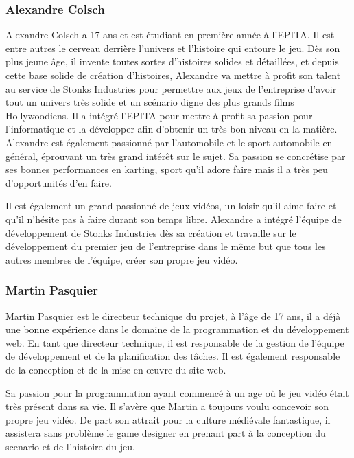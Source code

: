 \subsubsection*{Alexandre Colsch}

Alexandre Colsch a 17 ans et est étudiant en première année à l’EPITA.
Il est entre autres le cerveau derrière l’univers et l’histoire qui entoure le jeu.
Dès son plus jeune âge, il invente toutes sortes d’histoires solides et détaillées, et depuis cette base solide de création d’histoires, 
Alexandre va mettre à profit son talent au service de Stonks Industries pour permettre aux jeux de l’entreprise d’avoir tout un univers très solide et un scénario digne des plus grands films Hollywoodiens.
Il a intégré l’EPITA pour mettre à profit sa passion pour l’informatique et la développer afin d’obtenir un très bon niveau en la matière.
Alexandre est également passionné par l’automobile et le sport automobile en général, éprouvant un très grand intérêt sur le sujet.
Sa passion se concrétise par ses bonnes performances en karting, sport qu’il adore faire mais il a très peu d'opportunités d’en faire.

Il est également un grand passionné de jeux vidéos, un loisir qu’il aime faire et qu’il n'hésite pas à faire durant son temps libre.
Alexandre a intégré l'équipe de développement de Stonks Industries dès sa création et travaille sur le développement du premier jeu de l’entreprise dans le même but que tous les autres membres de l'équipe, créer son propre jeu vidéo.

\subsubsection*{Martin Pasquier}
    
Martin Pasquier est le directeur technique du projet, à l'âge de 17 ans, il a déjà une bonne expérience dans le domaine de la programmation et du développement web.   
En tant que directeur technique, il est responsable de la gestion de l'équipe de développement et de la planification des tâches.
Il est également responsable de la conception et de la mise en œuvre du site web.

Sa passion pour la programmation ayant commencé à un age où le jeu vidéo était très présent dans sa vie.
Il s'avère que Martin a toujours voulu concevoir son propre jeu vidéo.
De part son attrait pour la culture médiévale fantastique, il assistera sans problème le game designer en prenant part à la conception du scenario et de l'histoire du jeu.


